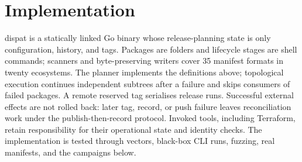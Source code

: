 \documentclass[10pt,conference]{IEEEtran}
\theoremstyle{definition}
\begin{document}
\begin{table}[t]
\caption{Pinned release-tool configurations.}
\label{tab:compare}
\scriptsize
{}
\end{table}

\section{Implementation}
\label{sec:impl}

dispat is a statically linked Go binary whose release-planning state is only
configuration, history, and tags. Packages are folders and lifecycle stages
are shell commands; scanners and byte-preserving writers cover 35 manifest
formats in twenty ecosystems. The planner implements the definitions above;
topological execution continues independent subtrees after a failure and
skips consumers of failed packages. A remote reserved tag serialises release
runs. Successful external effects are not rolled back: later tag, record, or
push failure leaves reconciliation work under the publish-then-record protocol. Invoked tools,
including Terraform, retain responsibility for their operational state and
identity checks. The implementation is tested through vectors, black-box CLI
runs, fuzzing, real manifests, and the campaigns below.
\end{document}
